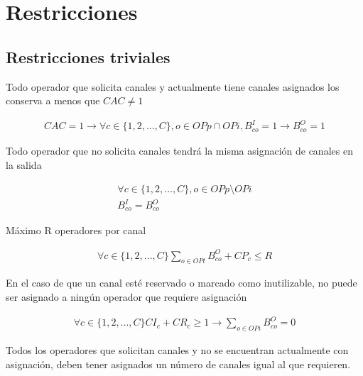 \section{Restricciones}

\subsection{Restricciones triviales}


Todo operador que solicita canales y actualmente tiene canales asignados los conserva a menos que $CAC \neq 1$

\begin{equation}
	\begin{array}{cc}
		CAC = 1 \to \forall c \in \{1,2,...,C\} ,o \in OPp \cap OPi, B^{I}_{co} = 1 \to  B^{O}_{co} = 1
	\end{array}
\end{equation}

Todo operador que no solicita canales tendrá la misma asignación de canales en la salida

\begin{equation}
	\begin{array}{cc}
		\forall c \in \{1,2,...,C\} , o \in OPp \setminus OPi\\
		B^{I}_{co} = B^{O}_{co}
	\end{array}
\end{equation}

Máximo R operadores por canal

\begin{equation}
	\begin{array}{cc}
		\forall c \in \{1,2,...,C\}  \sum \limits_{o \in OPt} B^{O}_{co} + CP_{c} \leq R
	\end{array}
\end{equation}

En el caso de que un canal esté reservado o marcado como inutilizable, no puede ser asignado a ningún operador que requiere asignación

\begin{equation}
	\begin{array}{cc}
		\forall c \in \{1,2,...,C\} CI_{c} + CR_{c} \geq 1 \to \sum \limits_{o \in OPi} B^{O}_{co} = 0
	\end{array}
\end{equation}

Todos los operadores que solicitan canales y no se encuentran actualmente con asignación, deben tener asignados un número de canales igual al que requieren.

